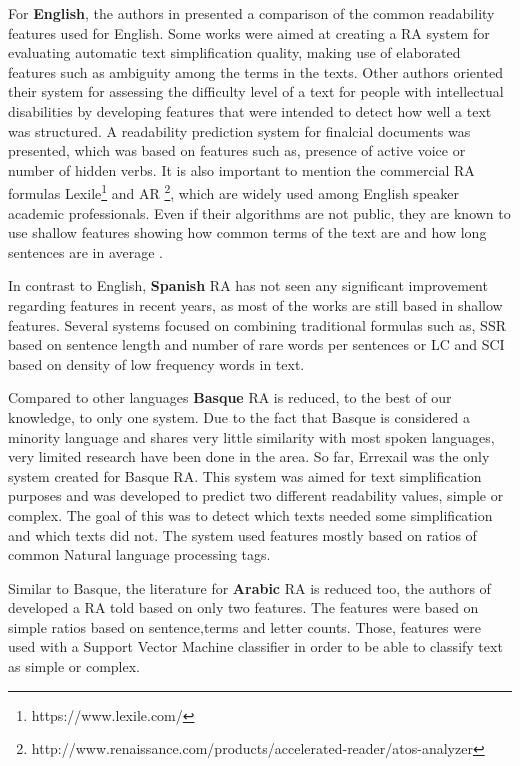 \documentclass[12pt]{article}
\begin{document}
For \textbf{English}, the authors in \cite{feng2010comparison} presented a comparison of the common readability features used for English. Some works \cite{aluisio2010readability} were aimed at creating a RA system for evaluating automatic text simplification quality, making use of elaborated features such as ambiguity among the terms in the texts. Other authors \cite{feng2009automatic} oriented their system for assessing the difficulty level of a text for people with intellectual disabilities by developing features that were intended to detect how well a text was structured. A readability prediction system for  finalcial documents\cite{bonsall2015plain} was presented, which was based on features such as, presence of active voice or number of hidden verbs. It is also important to mention the commercial RA formulas Lexile\footnote{https://www.lexile.com/} and AR \footnote{http://www.renaissance.com/products/accelerated-reader/atos-analyzer}, which are widely used among English speaker academic professionals. Even if their algorithms are not public, they are known to use shallow features showing how common terms of the text are and how long sentences are in average \cite{lennon2004lexile}.

In contrast to English, \textbf{Spanish} RA has not seen any significant improvement regarding features in recent years, as most of the works are still based in shallow features. Several systems\cite{vstajner2013readability,drndarevic2013automatic} focused on combining traditional formulas such as, SSR \cite{spaulding1956spanish} based on sentence length and number of rare words per sentences or LC and SCI \cite{anula2007tipos} based on density of low frequency words in text. 


Compared to other languages \textbf{Basque} RA is reduced, to the best of our knowledge, to only one system. Due to the fact that Basque is considered a minority language and shares very little similarity with most spoken languages, very limited research have been done in the area. So far,  Errexail \cite{gonzalez2014simple} was the only system created for Basque RA. This system was aimed for text simplification purposes and was developed to predict two different readability values, simple or complex. The goal of this was to detect which texts needed some simplification and which texts did not. The system used features mostly based on ratios of common Natural language processing tags.

Similar to Basque, the literature for \textbf{Arabic} RA is reduced too, the authors of \cite{al2008towards} developed a RA told based on only two features. The features were based on simple ratios based on sentence,terms and letter counts. Those, features were used with a Support Vector Machine classifier in order to be able to classify text as simple or complex.
\end{document}
